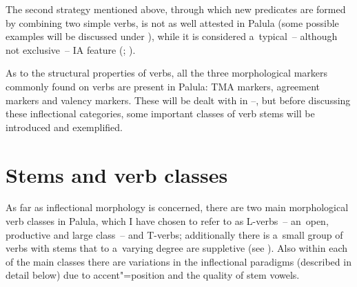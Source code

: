 The second strategy mentioned above, through which new predicates are formed by combining two simple verbs, is not as well attested in Palula (some possible examples will be discussed under ), while it is considered a~typical~-- although not exclusive~-- IA feature (\citealt[559]{ebert2006}; \citealt[250--252]{masica2001}). 



As to the structural properties of verbs, all the three morphological markers commonly found on verbs \citep[409]{viberg2006} are present in Palula: TMA markers, agreement markers and valency markers. These will be dealt with in --, but before discussing these inflectional categories, some important classes of verb stems will be introduced and exemplified.


\section{Stems and verb classes}
\label{sec:8-2}


As far as inflectional morphology is concerned, there are two main morphological verb classes in Palula, which I have chosen to refer to as L-verbs~-- an~open, productive and large class~-- and T-verbs; additionally there is a~small group of verbs with stems that to a~varying degree are suppletive (see ). Also within each of the main classes there are variations in the inflectional paradigms (described in detail below) due to accent"=position and the quality of stem vowels.


